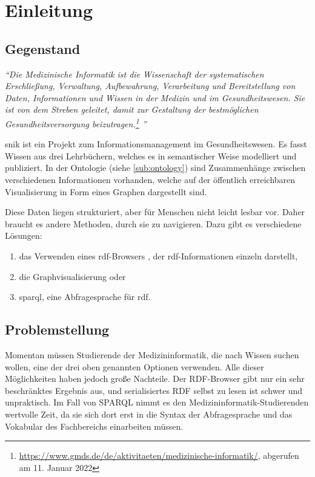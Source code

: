\chapter{Einleitung}\label{ch:introduction}

\section{Gegenstand}
\begin{flushright}{\slshape
\enquote{Die Medizinische Informatik ist die Wissenschaft der systematischen Erschließung, Verwaltung, Aufbewahrung, Verarbeitung und Bereitstellung von Daten, Informationen und Wissen in der Medizin und im Gesundheitswesen.
Sie ist von dem Streben geleitet, damit zur Gestaltung der bestmöglichen Gesundheitsversorgung beizutragen.\footnote{\url{https://www.gmds.de/de/aktivitaeten/medizinische-informatik/}, abgerufen am 11. Januar 2022}
}}
\end{flushright}
\acs{snik} ist ein Projekt zum Informationsmanagement im Gesundheitswesen.
Es fasst Wissen aus drei Lehrbüchern, welches es in semantischer Weise modelliert und publiziert.
In der Ontologie (siehe \cref{sub:ontology}) sind Zusammenhänge zwischen verschiedenen Informationen vorhanden,
welche auf der öffentlich erreichbaren Visualisierung in Form eines Graphen dargestellt sind.

Diese Daten liegen strukturiert, aber für Menschen nicht leicht lesbar vor.
Daher braucht es andere Methoden, durch sie zu navigieren.
Dazu gibt es verschiedene Lösungen:
\begin{enumerate}
	\item das Verwenden eines \acs{rdf}-Browsers \citep[S.~30]{linkeddatavisualisation}, der \acs{rdf}-Informationen einzeln darstellt,
	\item die Graphvisualisierung \citep[S.~32]{linkeddatavisualisation} oder
	\item \acs{sparql}, eine Abfragesprache für \acs{rdf}.
\end{enumerate}

\section{Problemstellung}\label{sec:problemstellung}

Momentan müssen Studierende der Medizininformatik, die nach Wissen suchen wollen, eine der drei oben genannten Optionen verwenden.
Alle dieser Möglichkeiten haben jedoch große Nachteile.
Der RDF-Browser gibt nur ein sehr beschränktes Ergebnis aus, und serialisiertes RDF selbst zu lesen ist schwer und unpraktisch.
Im Fall von SPARQL nimmt es den Medizininformatik-Studierenden wertvolle Zeit, da sie sich dort erst in die Syntax der Abfragesprache und das Vokabular des Fachbereichs einarbeiten müssen.


